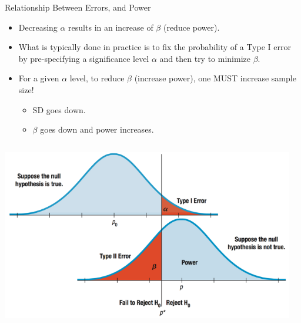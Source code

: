 \documentclass[
  ignorenonframetext,
]{beamer}
\providecommand{\tightlist}{%
  \setlength{\itemsep}{0pt}\setlength{\parskip}{0pt}}
\begin{document}
\begin{frame}{Relationship Between Errors, and Power}
\protect\hypertarget{relationship-between-errors-and-power}{}
\begin{itemize}
\item
  Decreasing \(\alpha\) results in an increase of \(\beta\) (reduce
  power).
\item
  What is typically done in practice is to fix the probability of a Type
  I error by pre-specifying a significance level \(\alpha\) and then try
  to minimize \(\beta\).
\item
  For a given \(\alpha\) level, to reduce \(\beta\) (increase power),
  one MUST increase sample size!

  \begin{itemize}
  \tightlist
  \item
    SD goes down.
  \item
    \(\beta\) goes down and power increases.
  \end{itemize}
\end{itemize}

\begin{columns}
\begin{column}{0.3\textwidth}



\begin{center}\includegraphics[width=1\linewidth]{week13_2} \end{center}


\end{column}
\begin{column}{0.3\textwidth}



\end{column}
\end{columns}
\end{frame}
\end{document}
